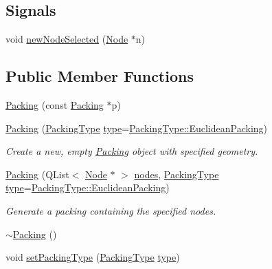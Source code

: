 \subsection*{Signals}
\begin{DoxyCompactItemize}
\item 
void \hyperlink{class_packing_a6c641c5342b0a9f0cdf6a5286da1faef}{new\+Node\+Selected} (\hyperlink{class_node}{Node} $\ast$n)
\end{DoxyCompactItemize}
\subsection*{Public Member Functions}
\begin{DoxyCompactItemize}
\item 
\hyperlink{class_packing_afc2e978d83701a4f45cf4c3a397d669d}{Packing} (const \hyperlink{class_packing}{Packing} $\ast$p)
\item 
\hyperlink{class_packing_ac182cdb0765b020bb5289d0980cf1fd6}{Packing} (\hyperlink{graphics_2_packing_8hpp_a331874350131c9e1039dac50b427f8b9}{Packing\+Type} \hyperlink{class_packing_a934cbe1ef81173f5e7fbabf9846d16e2}{type}=\hyperlink{graphics_2_packing_8hpp_a331874350131c9e1039dac50b427f8b9aa4066bbe6791ed6bbfe12f55a60ed152}{Packing\+Type\+::\+Euclidean\+Packing})
\begin{DoxyCompactList}\small\item\em Create a new, empty \hyperlink{class_packing}{Packing} object with specified geometry. \end{DoxyCompactList}\item 
\hyperlink{class_packing_a4091c1456760961dee4d94ed5f440ac4}{Packing} (Q\+List$<$ \hyperlink{class_node}{Node} $\ast$ $>$ \hyperlink{class_packing_afee4e76e75aea147685840e19c714d08}{nodes}, \hyperlink{graphics_2_packing_8hpp_a331874350131c9e1039dac50b427f8b9}{Packing\+Type} \hyperlink{class_packing_a934cbe1ef81173f5e7fbabf9846d16e2}{type}=\hyperlink{graphics_2_packing_8hpp_a331874350131c9e1039dac50b427f8b9aa4066bbe6791ed6bbfe12f55a60ed152}{Packing\+Type\+::\+Euclidean\+Packing})
\begin{DoxyCompactList}\small\item\em Generate a packing containing the specified nodes. \end{DoxyCompactList}\item 
\hyperlink{class_packing_ad67852c54df83e034b441389846d6c7c}{$\sim$\+Packing} ()
\item 
void \hyperlink{class_packing_a3ba83f90994302b47fc61dde4bec6246}{set\+Packing\+Type} (\hyperlink{graphics_2_packing_8hpp_a331874350131c9e1039dac50b427f8b9}{Packing\+Type} \hyperlink{class_packing_a934cbe1ef81173f5e7fbabf9846d16e2}{type})

\end{DoxyCompactItemize}
